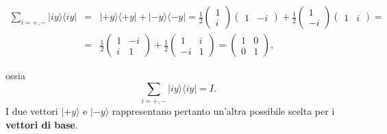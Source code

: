 	\begin{eqnarray}
		\sum _{i=+,-} |iy \rangle \langle iy | &=& | +y \rangle \langle +y | + |-y \rangle \langle -y | =   \frac{1}{2}
		\begin{pmatrix}
		1\\
		i
		\end{pmatrix}
		\begin{pmatrix}
		1 & -i
		\end{pmatrix}+
		\frac{1}{2}
		\begin{pmatrix}
		1\\
		-i
		\end{pmatrix}
		\begin{pmatrix}
		1 & i
		\end{pmatrix}= \nonumber \\
		&=& \frac{1}{2}
		\begin{pmatrix}
		1 & -i\\
		i & 1
		\end{pmatrix}+
		\frac{1}{2}
		\begin{pmatrix}
		1 & i\\
		-i & 1
		\end{pmatrix}=
		\begin{pmatrix}
		1 & 0\\
		0 & 1
		\end{pmatrix},
		\end{eqnarray}

ossia
	\begin{equation}
		\sum \limits_{i=+,-}  | iy \rangle \langle  iy  |=I .
	\end{equation}
I due vettori $| +y \rangle $ e $| -y \rangle $ rappresentano pertanto un'altra possibile scelta per i \textbf{vettori di base}.\\

